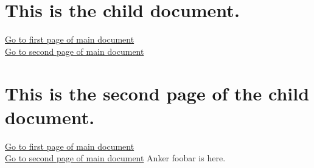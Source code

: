 \documentclass{article}
\begin{document}
   \section{This is the child document.}
   \href{gotoe:%
   dest={page.1},parent%
   }{Go to first page of main document}\\
   \href{gotoe:%
   dest={page.2},parent%
   }{Go to second page of main document}
   \newpage
   \section{This is the second page of the child document.}
   \href{gotoe:%
   dest={page.1},parent%
   }{Go to first page of main document}\\
   \href{gotoe:%
   dest={page.2},parent%
   }{Go to second page of main document}
   \hypertarget{foobar}{}
   Anker foobar is here.
   
\end{document}
